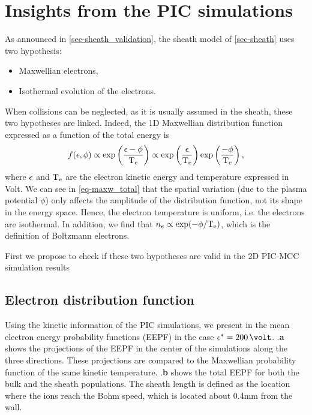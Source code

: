 


\section{Insights from the PIC simulations}
  \label{sec-insights}

  As announced in \cref{sec-sheath_validation}, the sheath model of \cref{sec-sheath} uses two hypothesis\string:
  \begin{itemize}
    \item Maxwellian electrons,
    \item Isothermal evolution of the electrons.
  \end{itemize}

  When collisions can be neglected, as it is usually assumed in the sheath, these two hypotheses are linked.
  Indeed, the \ac{1D} Maxwellian distribution function expressed as a function of the total energy is
  \begin{equation} \label{eq-maxw_total}
    f(\epsilon, \phi) \propto \exp \left( \frac{\epsilon - \phi}{\mathrm{T_e}}  \right)  \propto \exp \left( \frac{\epsilon}{\mathrm{T_e}} \right) \exp \left( \frac{-\phi}{\mathrm{T_e}} \right),
  \end{equation}
  where $\epsilon$ and $\mathrm{T_e}$ are the electron kinetic energy and temperature expressed in Volt.
  We can see in \cref{eq-maxw_total} that the spatial variation (due to the plasma potential $\phi$) only affects the amplitude of the distribution function, not its shape in the energy space.
  Hence, the electron temperature is uniform, i.e. the electrons are isothermal.
  In addition, we find that $n_e \propto \exp (- \phi / \mathrm{T_e})$, which is the definition of Boltzmann electrons.

  First we propose to check  if these two hypotheses are valid  in the \ac{2D} \ac{PIC}-\ac{MCC} simulation results

  \subsection{Electron distribution function}
    \label{subsec-eedf_2D}

    Using the kinetic information of the PIC simulations, we present in  the mean electron energy probability functions (EEPF) in the case $\crover = 200\,\volt$.
    .{\bf a} shows the projections of the EEPF in the center of the simulations along the three directions.
    These projections are compared to the Maxwellian probability function of the same
    kinetic temperature.
    .{\bf b} shows the total EEPF for both the bulk and the sheath populations.
    The sheath length is defined as the location where the ions reach the Bohm speed, which is located about 0.4mm from the wall.
     
